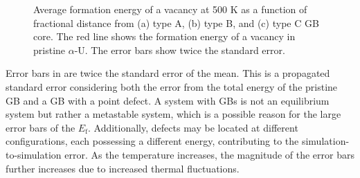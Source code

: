 \documentclass[review]{elsarticle}
\begin{document}
\begin{figure}[h!]
\centering
{} 
\caption{Average formation energy of a vacancy at 500 K as a function of fractional distance from (a) type A, (b) type B, and (c) type C GB core. The red line shows the formation energy of a vacancy in pristine $\alpha$-U. The error bars show twice the standard error.}
\label{fig:Seg_vacancy_500}
\end{figure}

\par Error bars in  are twice the standard error of the mean. This is a propagated standard error considering both the error from the total energy of the pristine GB and a GB with a point defect. A system with GBs is not an equilibrium system but rather a metastable system, which is a possible reason for the large error bars of the $E_{\mathrm{f}}$. Additionally, defects may be located at different configurations, each possessing a different energy, contributing to the simulation-to-simulation error. As the temperature increases, the magnitude of the error bars further increases due to increased thermal fluctuations.
\end{document}

